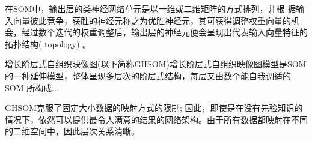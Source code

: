 在SOM中，输出层的类神经网络单元是以一维或二维矩阵的方式排列，并根 据输入向量彼此竞争，获胜的神经元称之为优胜神经元，其可获得调整权重向量的机会，经过数个迭代的权重调整后，输出层的神经元便会呈现出代表输入向量特征的拓扑结构( topology) 。

增长阶层式自组织映像图(以下简称GHSOM)增长阶层式自组织映像图模型是SOM的一种延伸模型，整体呈现多层次的阶层式结构，每层又由数个能自我调适的 SOM 所构成...


GHSOM克服了固定大小数据的映射方式的限制; 因此，即使是在没有先验知识的情况下，依然可以提供最令人满意的结果的网络架构。由于所有数据都映射在不同的二维空间中，因此层次关系清晰。



